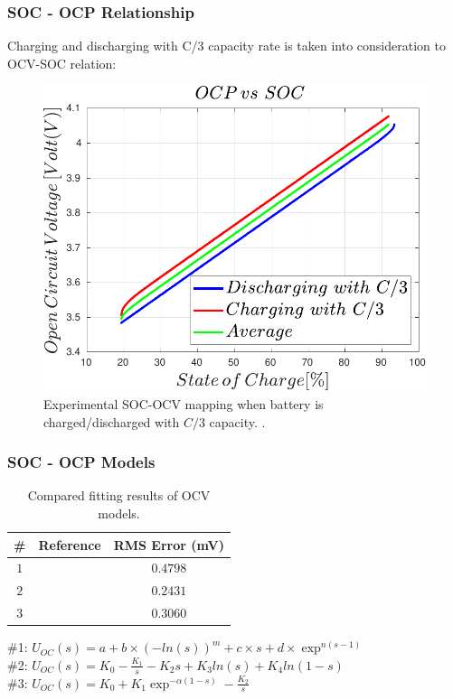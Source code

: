 \documentclass{beamer}
\renewcommand{\cite}[1]{\footnote<.->[frame]{\fullcite{#1}}}
\begin{document}
\begin{frame}
	
	\frametitle{SOC - OCP Relationship}
	
	Charging and discharging with C/3 capacity rate is taken
	into consideration to OCV-SOC relation:

	\begin{figure}
		\label{fig:OCV_vs_SOC}
		\includegraphics[scale=0.60]{images/OCV_vs_SOC.pdf}
		\vspace{-2mm}
		\caption{ Experimental SOC-OCV mapping when battery is charged/discharged with $C/3$ capacity.
			.}
	\end{figure}
	
\end{frame}


\begin{frame}
	
	\frametitle{SOC - OCP Models}
	
	\begin{table}[!b]
		\begin{tabular}{c | c | c } 
			\hline
			\# & Reference & RMS Error (mV)\\ [0.5ex] 
			\hline\hline
			$1$ &  \cite{Zhang2016} & $0.4798$ \\ 
			\hline
			$2$ &  \cite{Plett2004} & $0.2431$ \\ 
			\hline
			$3$ & \cite{Neumann2011} & $0.3060$ \\ 
			\hline
		\end{tabular}
		\caption{\label{table:Comparing_Fitting_Results}Compared fitting results of OCV models.}
	\end{table}
	
	\#1: $U_{OC}(s) = a  + b \times (-ln(s))^m + c \times s + d \times \exp^{n(s-1)}$ \\
	\#2: $U_{OC}(s) = K_{0} - \frac{K_{1}}{s} - K_{2}s + K_{3}ln(s) + K_{4}ln(1 - s)$ \\
	\#3: $U_{OC}(s) = K_{0} + K_{1}{\exp}^{-\alpha(1-s)} - \frac{K_{2}}{s}$ 
	
\end{frame}
\end{document}
